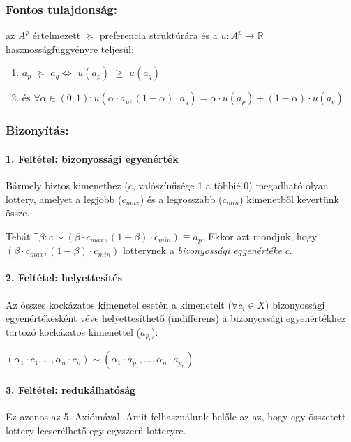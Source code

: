 \documentclass[a4paper,12pt]{article}
\begin{document}
\subsubsection{Fontos tulajdonság: } az $A^p$ értelmezett $\succeq$ preferencia struktúrára és a $u: A^p \rightarrow \mathbb{R}$ hasznosságfüggvényre teljesül: 
\begin{enumerate}
\item $a_p$  $\succeq$ $a_q \Leftrightarrow $ $u(a_p)$  $\geq$ $u(a_q)$
\item és $\forall  \alpha \in (0,1): u(\alpha\cdot a_p , (1-\alpha)\cdot a_q ) = \alpha\cdot u(a_p) + (1-\alpha)\cdot u(a_q) $
\end{enumerate}

\subsubsection{Bizonyítás: }
 
\paragraph{1. Feltétel: bizonyossági egyenérték}
Bármely biztos kimenethez ($c$, valószínűsége 1 a többié 0) megadható olyan lottery, amelyet a legjobb ($c_{max}$) és a legrosszabb ($c_{min}$) kimenetből kevertünk össze. 

Tehát $\exists \beta: c \sim (\beta\cdot c_{max}, (1-\beta)\cdot c_{min}) \equiv a_p$. Ekkor azt mondjuk, hogy $(\beta\cdot c_{max}, (1-\beta)\cdot c_{min})$ lotterynek a \emph{bizonyossági egyenértéke} $c$.

\paragraph{2. Feltétel: helyettesítés}

Az összes kockázatos kimenetel esetén a kimenetelt ($\forall c_i \in X$) bizonyossági egyenértékesként véve helyettesíthető (indifferens) a bizonyossági egyenértékhez tartozó kockázatos kimenettel ($a_{p_i}$):

$(\alpha_1 \cdot c_1 , ... ,\alpha_n \cdot c_n ) \sim (\alpha_1 \cdot a_{p_1}, ... ,\alpha_n \cdot a_{p_n}) $


\paragraph{3. Feltétel: redukálhatóság}

Ez azonos az 5. Axiómával. Amit felhasználunk belőle az az, hogy egy összetett lottery lecserélhető egy egyszerű lotteryre.
\end{document}
